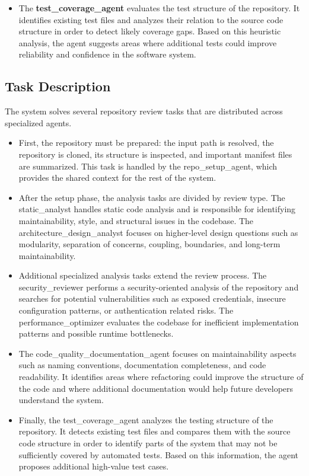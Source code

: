 \documentclass[conference]{IEEEtran}
\begin{document}
\begin{itemize}
	\item The \textbf{test\_coverage\_agent} evaluates the test structure of the repository. It identifies existing test files and analyzes their relation to the source code structure in order to detect likely coverage gaps. Based on this heuristic analysis, the agent suggests areas where additional tests could improve reliability and confidence in the software system.
\end{itemize}

\subsection{Task Description}
The system solves several repository review tasks that are distributed across specialized agents. 

\begin{itemize}
	\item First, the repository must be prepared: the input path is resolved, the repository is cloned, its structure is inspected, and important manifest files are summarized. This task is handled by the repo\_setup\_agent, which provides the shared context for the rest of the system.
	\item After the setup phase, the analysis tasks are divided by review type. The static\_analyst handles static code analysis and is responsible for identifying maintainability, style, and structural issues in the codebase. The architecture\_design\_analyst focuses on higher-level design questions such as modularity, separation of concerns, coupling, boundaries, and long-term maintainability. 
	
	
	\item Additional specialized analysis tasks extend the review process. The security\_reviewer performs a security-oriented analysis of the repository and searches for potential vulnerabilities such as exposed credentials, insecure configuration patterns, or authentication related risks. The performance\_optimizer evaluates the codebase for inefficient implementation patterns and possible runtime bottlenecks.
	
	
	\item The code\_quality\_documentation\_agent focuses on maintainability aspects such as naming conventions, documentation completeness, and code readability. It identifies areas where refactoring could improve the structure of the code and where additional documentation would help future developers understand the system.
	
	
	\item Finally, the test\_coverage\_agent analyzes the testing structure of the repository. It detects existing test files and compares them with the source code structure in order to identify parts of the system that may not be sufficiently covered by automated tests. Based on this information, the agent proposes additional high-value test cases.
\end{itemize}
\end{document}
